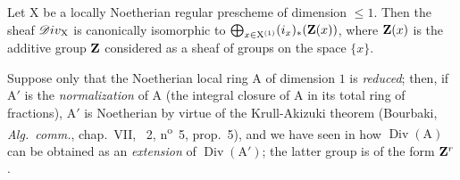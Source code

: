 \begin{proposition}[21.9.9]
\label{IV.21.9.9}
Let $\mathrm{X}$ be a locally Noetherian \textup{regular} prescheme of dimension $\leq 1$.
Then the sheaf $\mathscr{D}iv_\mathrm{X}$ is canonically isomorphic to $\bigoplus_{x\in\mathrm{X}^{(1)}}(i_x)_*(\mathbf{Z}(x))$, where $\mathbf{Z}(x)$ is the additive group $\mathbf{Z}$ considered as a sheaf of groups on the space $\{x\}$.
\end{proposition}

\begin{env}[21.9.10]
\label{IV.21.9.10}
Suppose only that the Noetherian local ring $\mathrm{A}$ of dimension $1$ is \emph{reduced};
then, if $\mathrm{A}'$ is the \emph{normalization} of $\mathrm{A}$ (the integral closure of $\mathrm{A}$ in its total ring of fractions), $\mathrm{A}'$ is Noetherian by virtue of the Krull-Akizuki theorem (Bourbaki, \emph{Alg.\ comm.}, chap.~VII, \textsection~2, n\textsuperscript{o}~5, prop.~5), and we have seen in  how
$\operatorname{Div}(\mathrm{A})$ can be obtained as an \emph{extension} of $\operatorname{Div}(\mathrm{A}')$; the latter group is of the form $\mathbf{Z}^r$.
\end{env}

